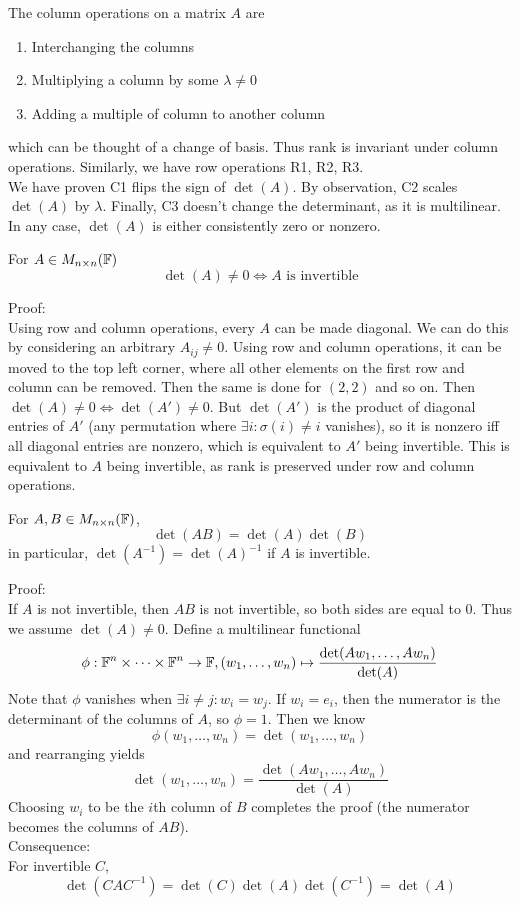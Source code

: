 \documentclass[12pt]{article}
\begin{document}
The column operations on a matrix $A$ are

\begin{enumerate}
	\item Interchanging the columns \\
	\item Multiplying a column by some $\lambda\neq0$ \\
	\item Adding a multiple of column to another column
\end{enumerate}

which can be thought of a change of basis. Thus rank is invariant under column operations. Similarly, we have row operations R1, R2, R3. \\
We have proven C1 flips the sign of $\det(A)$. By observation, C2 scales $\det(A)$ by $\lambda$. Finally, C3 doesn't change the determinant, as it is multilinear. In any case, $\det(A)$ is either consistently zero or nonzero.

\begin{thm}
	For $A\in M_{n\times n}(\mathbb{F})$
	$$\det(A)\neq0 \Leftrightarrow A \text{ is invertible}$$
\end{thm}

Proof: \\
Using row and column operations, every $A$ can be made diagonal. We can do this by considering an arbitrary $A_{ij}\neq0$. Using row and column operations, it can be moved to the top left corner, where all other elements on the first row and column can be removed. Then the same is done for $(2,2)$ and so on. Then $\det(A)\neq0\Leftrightarrow\det(A')\neq0$. But $\det(A')$ is the product of diagonal entries of $A'$ (any permutation where $\exists i:\sigma(i)\neq i$ vanishes), so it is nonzero iff all diagonal entries are nonzero, which is equivalent to $A'$ being invertible. This is equivalent to $A$ being invertible, as rank is preserved under row and column operations.

\begin{thm}
	For $A,B\in M_{n\times n}(\mathbb{F})$,
	$$\det(AB) = \det(A)\det(B)$$
	in particular, $\det(A^{-1}) = \det(A)^{-1}$ if $A$ is invertible.
\end{thm}

Proof: \\
If $A$ is not invertible, then $AB$ is not invertible, so both sides are equal to 0. Thus we assume $\det(A)\neq0$. Define a multilinear functional
$$\phi:\mathbb{F}^n\times\dots\times\mathbb{F}^n\rightarrow\mathbb{F}, (w_1,\dots,w_n) \mapsto \frac{\det(Aw_1,\dots,Aw_n)}{\det(A)}$$
Note that $\phi$ vanishes when $\exists i\neq j:w_i=w_j$. If $w_i=e_i$, then the numerator is the determinant of the columns of $A$, so $\phi=1$. Then we know
$$\phi(w_1,\dots,w_n) = \det(w_1,\dots,w_n)$$
and rearranging yields
$$\det(w_1,\dots,w_n) = \frac{\det(Aw_1,\dots,Aw_n)}{\det(A)}$$
Choosing $w_i$ to be the $i$th column of $B$ completes the proof (the numerator becomes the columns of $AB$). \\
Consequence: \\
For invertible $C$,
$$\det(CAC^{-1}) = \det(C)\det(A)\det(C^{-1}) = \det(A)$$
\end{document}

